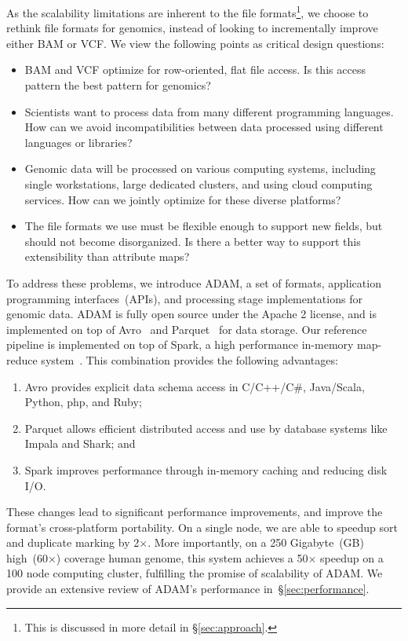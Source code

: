 \documentclass{bioinfo}
\begin{document}
As the scalability limitations are inherent to the file formats\footnote{This is discussed in more detail in \S\ref{sec:approach}.}, we
choose to rethink file formats for genomics, instead of looking to incrementally improve either BAM or VCF. We view the following
points as critical design questions:

\begin{itemize}
\item BAM and VCF optimize for row-oriented, flat file access. Is this access pattern the best pattern for genomics?
\item Scientists want to process data from many different programming languages. How can we avoid incompatibilities between
data processed using different languages or libraries?
\item Genomic data will be processed on various computing systems, including single workstations, large dedicated clusters,
and using cloud computing services. How can we jointly optimize for these diverse platforms?
\item The file formats we use must be flexible enough to support new fields, but should not become disorganized. Is there a better
way to support this extensibility than attribute maps?
\end{itemize}

To address these problems, we introduce ADAM, a set of formats, application programming interfaces~(APIs), and processing stage
implementations for genomic data. ADAM is fully open source under the Apache 2 license, and is implemented on top of Avro~\citep{avro}
and Parquet~\citep{parquet} for data storage. Our reference pipeline is implemented on top of Spark, a high performance in-memory map-reduce
system~\citep{zaharia10}. This combination provides the following advantages:

\begin{enumerate}
\item Avro provides explicit data schema access in C/C++/C\#, Java/Scala, Python, php, and Ruby;
\item Parquet allows efficient distributed access and use by database systems like Impala and Shark; and 
\item Spark improves performance through in-memory caching and reducing disk I/O.
\end{enumerate}

These changes lead to significant performance improvements, and improve the format's cross-platform portability. On a single
node, we are able to speedup sort and duplicate marking by 2$\times$. More importantly, on a 250 Gigabyte~(GB) high~(60$\times$) coverage
human genome, this system achieves a 50$\times$ speedup on a 100 node computing cluster, fulfilling the promise of scalability of ADAM.
We provide an extensive review of ADAM's performance in~\S\ref{sec:performance}.
\end{document}
